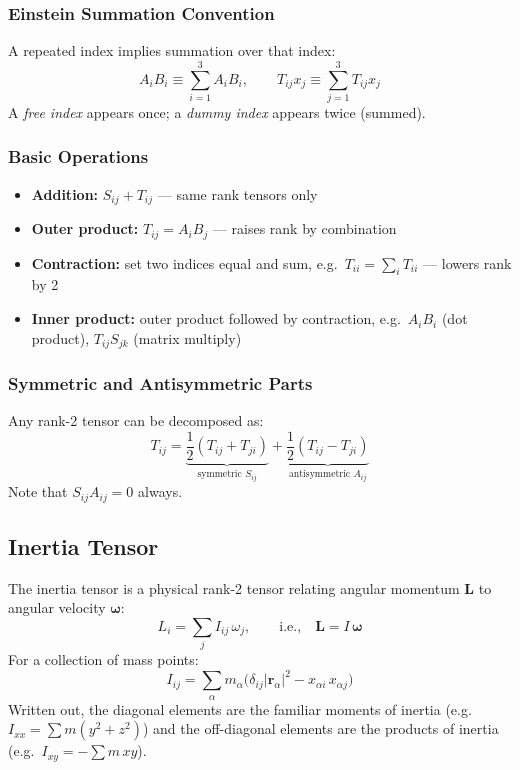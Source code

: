 \documentclass[11pt, letterpaper]{article}
\theoremstyle{plain}
\newcommand{\vv}[1]{\bm{#1}}
\begin{document}
\subsubsection*{Einstein Summation Convention}
A repeated index implies summation over that index:
\[
    A_i B_i \equiv \sum_{i=1}^{3} A_i B_i, \qquad
    T_{ij}x_j \equiv \sum_{j=1}^{3} T_{ij}x_j
\]
A \emph{free index} appears once; a \emph{dummy index} appears twice (summed).

\subsubsection*{Basic Operations}
\begin{itemize}
    \item \textbf{Addition:} $S_{ij} + T_{ij}$ — same rank tensors only
    \item \textbf{Outer product:} $T_{ij} = A_i B_j$ — raises rank by combination
    \item \textbf{Contraction:} set two indices equal and sum, e.g.\
          $T_{ii} = \sum_i T_{ii}$ — lowers rank by 2
    \item \textbf{Inner product:} outer product followed by contraction,
          e.g.\ $A_i B_i$ (dot product), $T_{ij}S_{jk}$ (matrix multiply)
\end{itemize}

\subsubsection*{Symmetric and Antisymmetric Parts}
Any rank-2 tensor can be decomposed as:
\[
    T_{ij} = \underbrace{\frac{1}{2}(T_{ij} + T_{ji})}_{\text{symmetric } S_{ij}}
           + \underbrace{\frac{1}{2}(T_{ij} - T_{ji})}_{\text{antisymmetric } A_{ij}}
\]
Note that $S_{ij}A_{ij} = 0$ always.


\subsection{Inertia Tensor}

The inertia tensor is a physical rank-2 tensor relating angular momentum
$\vv{L}$ to angular velocity $\vv{\omega}$:
\[
    L_i = \sum_j I_{ij}\,\omega_j, \qquad \text{i.e.,} \quad \vv{L} = I\,\vv{\omega}
\]
For a collection of mass points:
\[
    I_{ij} = \sum_\alpha m_\alpha
    \bigl(\delta_{ij}|\vv{r}_\alpha|^2 - x_{\alpha i}\,x_{\alpha j}\bigr)
\]
Written out, the diagonal elements are the familiar moments of inertia
(e.g.\ $I_{xx} = \sum m(y^2 + z^2)$) and the off-diagonal elements are
the products of inertia (e.g.\ $I_{xy} = -\sum m\,xy$).
\end{document}
